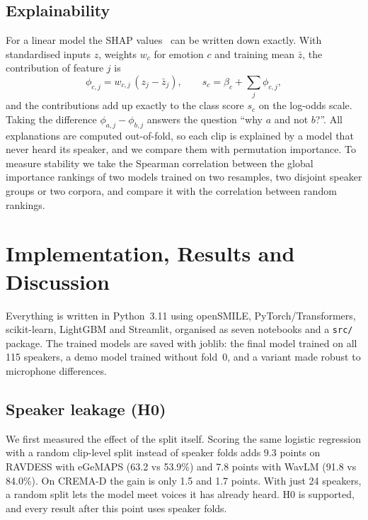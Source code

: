 \documentclass[conference]{IEEEtran}
\begin{document}
\subsection{Explainability}
For a linear model the SHAP values~\cite{shap} can be written down exactly. With standardised inputs $z$, weights $w_c$ for emotion $c$ and training mean $\bar z$, the contribution of feature $j$ is
\begin{equation}
\phi_{c,j} = w_{c,j}\,(z_j - \bar z_j), \qquad s_c = \beta_c + \sum_j \phi_{c,j},
\end{equation}
and the contributions add up exactly to the class score $s_c$ on the log-odds scale. Taking the difference $\phi_{a,j}-\phi_{b,j}$ answers the question ``why $a$ and not $b$?''. All explanations are computed out-of-fold, so each clip is explained by a model that never heard its speaker, and we compare them with permutation importance. To measure stability we take the Spearman correlation between the global importance rankings of two models trained on two resamples, two disjoint speaker groups or two corpora, and compare it with the correlation between random rankings.

\section{Implementation, Results and Discussion}
Everything is written in Python~3.11 using openSMILE, PyTorch/Transformers, scikit-learn, LightGBM and Streamlit, organised as seven notebooks and a \texttt{src/} package. The trained models are saved with joblib: the final model trained on all 115 speakers, a demo model trained without fold~0, and a variant made robust to microphone differences.

\subsection{Speaker leakage (H0)}
We first measured the effect of the split itself. Scoring the same logistic regression with a random clip-level split instead of speaker folds adds 9.3 points on RAVDESS with eGeMAPS (63.2 vs 53.9\%) and 7.8 points with WavLM (91.8 vs 84.0\%). On CREMA-D the gain is only 1.5 and 1.7 points. With just 24 speakers, a random split lets the model meet voices it has already heard. H0 is supported, and every result after this point uses speaker folds.
\end{document}
